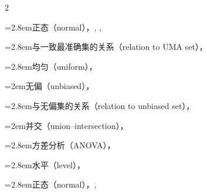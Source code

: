 \begin{multicols}{2}
\par\noindent\hangindent=2.8em\hspace*{1.8em}\label{idx:517}正态（normal），\hyperref[ex:8.3.15]{\pageref*{ex:8.3.15}}, \hyperref[ex:8.3.18]{\pageref*{ex:8.3.18}}, \hyperref[exercise:8.37]{\pageref*{exercise:8.37}}\par
\par\noindent\hangindent=2.8em\hspace*{1.8em}\label{idx:518}与一致最准确集的关系（relation to UMA set），\hyperref[thm:9.3.5]{\pageref*{thm:9.3.5}}\par
\par\noindent\hangindent=2.8em\hspace*{1.8em}\label{idx:519}均匀（uniform），\hyperref[exercise:8.33]{\pageref*{exercise:8.33}}\par
\par\noindent\hangindent=2em\hspace*{1em}\label{idx:520}无偏（unbiased），\hyperref[def:8.3.9]{\pageref*{def:8.3.9}}\par
\par\noindent\hangindent=2.8em\hspace*{1.8em}\label{idx:521}与无偏集的关系（relation to unbiased set），\hyperref[idxocc:521:392]{\pageref*{idxocc:521:392}}\par
\par\noindent\hangindent=2em\hspace*{1em}\label{idx:522}并交（union–intersection），\hyperref[eq:8.2.4]{\pageref*{eq:8.2.4}}\par
\par\noindent\hangindent=2.8em\hspace*{1.8em}\label{idx:523}方差分析（ANOVA），\hyperref[thm:11.2.5]{\pageref*{thm:11.2.5}}\par
\par\noindent\hangindent=2.8em\hspace*{1.8em}\label{idx:524}水平（level），\hyperref[thm:8.3.21]{\pageref*{thm:8.3.21}}\par
\par\noindent\hangindent=2.8em\hspace*{1.8em}\label{idx:525}正态（normal），\hyperref[ex:8.2.8]{\pageref*{ex:8.2.8}}, \hyperref[ex:8.3.8]{\pageref*{ex:8.3.8}}\par
\par\addvspace{2pt}

\end{multicols}
